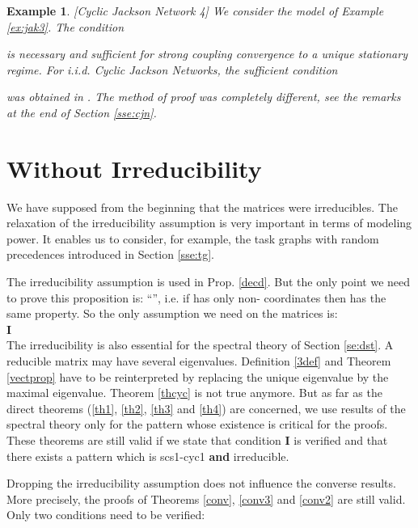 \documentclass[11pt,titlepage]{article}
\newcommand{\parag}{\medskip\noindent}
\newtheorem{example}[theo]{Example }
\newenvironment{exam}{\begin{example}\rm}{\end{example}}
\begin{document}
\begin{exam}[Cyclic Jackson Network 4] 
\label{ex:jak4}
We consider the model of Example \ref{ex:jak3}. The condition

is necessary
and sufficient for strong coupling convergence to a
unique stationary regime.
For i.i.d. Cyclic Jackson Networks,
the sufficient condition 
 
was obtained in
\cite{KaMa92}. The method of proof was completely
different, 
see the remarks at the end of Section \ref{sse:cjn}.
\end{exam}


\section{Without Irreducibility}
\label{se:wi}
We have supposed from the beginning that the matrices  were
irreducibles. 
The relaxation of the
irreducibility assumption is very important in terms of modeling power.
It enables us to 
consider, for example, the task graphs with random precedences introduced in
Section \ref{sse:tg}.

\parag

The irreducibility assumption
is used in 
Prop. \ref{decd}. But the only point we need to prove this
proposition is: 
``'', i.e. if  has only non-
coordinates then  has the same property. So the only 
assumption we 
need on the matrices  is:\\

\hspace*{1cm} {\bf I}  \\

The
irreducibility is also essential for the  spectral theory of Section
\ref{se:dst}.  
A reducible matrix  may
have several eigenvalues. Definition \ref{3def} and Theorem \ref{vectprop}
have to be reinterpreted by replacing the unique eigenvalue 
by the maximal 
eigenvalue. 
Theorem \ref{thcyc} is not true anymore.
But as far as the direct theorems
(\ref{th1}, \ref{th2}, \ref{th3} and \ref{th4}) are concerned, we use results of
the  spectral theory only for the pattern  whose 
existence is critical for the proofs. These theorems are still valid if we state
that condition {\bf I} is verified and that there exists a 
pattern  
which is scs1-cyc1
{\bf and} irreducible.
 
\parag
Dropping the irreducibility assumption does not influence the converse results.
More precisely, the proofs of 
Theorems \ref{conv}, \ref{conv3} and \ref{conv2} are still valid. 
Only two conditions
need to
be verified: \\
\end{document}
